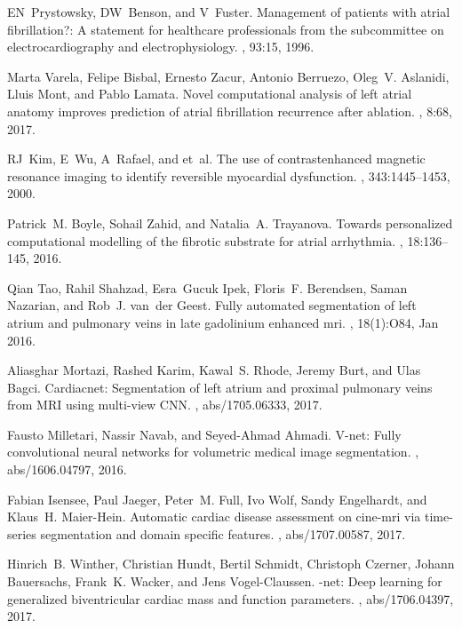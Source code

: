 \documentclass{llncs}
\begin{document}
\begin{thebibliography}{10}

EN~Prystowsky, DW~Benson, and V~Fuster.
\newblock Management of patients with atrial fibrillation?: A statement for
  healthcare professionals from the subcommittee on electrocardiography and
  electrophysiology.
, 93:15, 1996.

Marta Varela, Felipe Bisbal, Ernesto Zacur, Antonio Berruezo, Oleg~V. Aslanidi,
  Lluis Mont, and Pablo Lamata.
\newblock Novel computational analysis of left atrial anatomy improves
  prediction of atrial fibrillation recurrence after ablation.
, 8:68, 2017.

RJ~Kim, E~Wu, A~Rafael, and et~al.
\newblock The use of contrastenhanced magnetic resonance imaging to identify
  reversible myocardial dysfunction.
, 343:1445--1453, 2000.

Patrick~M. Boyle, Sohail Zahid, and Natalia~A. Trayanova.
\newblock Towards personalized computational modelling of the fibrotic
  substrate for atrial arrhythmia.
, 18:136--145, 2016.

Qian Tao, Rahil Shahzad, Esra~Gucuk Ipek, Floris~F. Berendsen, Saman Nazarian,
  and Rob~J. van~der Geest.
\newblock Fully automated segmentation of left atrium and pulmonary veins in
  late gadolinium enhanced mri.
, 18(1):O84, Jan
  2016.

Aliasghar Mortazi, Rashed Karim, Kawal~S. Rhode, Jeremy Burt, and Ulas Bagci.
\newblock Cardiacnet: Segmentation of left atrium and proximal pulmonary veins
  from {MRI} using multi-view {CNN}.
, abs/1705.06333, 2017.

Fausto Milletari, Nassir Navab, and Seyed{-}Ahmad Ahmadi.
\newblock V-net: Fully convolutional neural networks for volumetric medical
  image segmentation.
, abs/1606.04797, 2016.

Fabian Isensee, Paul Jaeger, Peter~M. Full, Ivo Wolf, Sandy Engelhardt, and
  Klaus~H. Maier{-}Hein.
\newblock Automatic cardiac disease assessment on cine-mri via time-series
  segmentation and domain specific features.
, abs/1707.00587, 2017.

Hinrich~B. Winther, Christian Hundt, Bertil Schmidt, Christoph Czerner, Johann
  Bauersachs, Frank~K. Wacker, and Jens Vogel{-}Claussen.
\newblock{\textdollar}{\(\nu\)}{\textdollar}-net: Deep learning for
  generalized biventricular cardiac mass and function parameters.
, abs/1706.04397, 2017.


\end{thebibliography}
\end{document}
